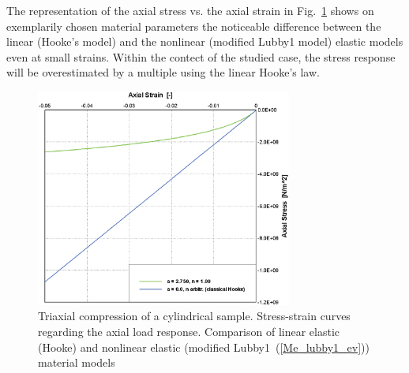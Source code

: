 The representation of the axial stress vs. the axial strain in Fig.~\ref{Me_triax_res_lubby1} shows on exemplarily chosen material parameters the noticeable difference between the linear (Hooke's model) and the nonlinear (modified Lubby1 model) elastic models even at small strains. Within the contect of the studied case, the stress response will be overestimated by a multiple using the linear Hooke's law. 


\begin{figure}[!htb]
\begin{center}
\includegraphics[width=0.75\textwidth]{PART_II/M/svv_e_stress_strain_hooke_lubby1m.eps}
\end{center}
\caption{Triaxial compression of a cylindrical sample. Stress-strain curves regarding the axial load response. Comparison of linear elastic (Hooke) and nonlinear elastic (modified Lubby1~(\ref{Me_lubby1_ev})) material models} 
\label{Me_triax_res_lubby1}
\end{figure}

